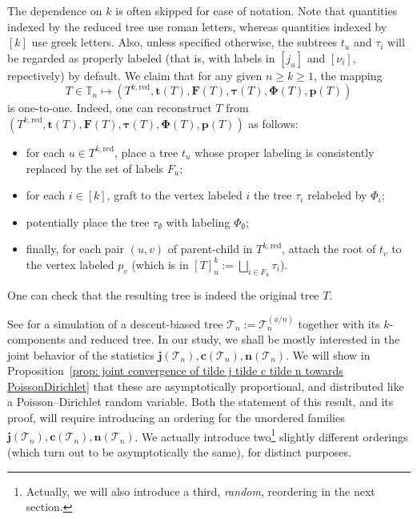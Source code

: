 \documentclass{article}
\theoremstyle{remark}
\newcommand{\bT}{\mathbb{T}}
\newcommand{\cT}{\mathcal{T}}
\newcommand{\bc}{\mathbf{c}}
\newcommand{\bj}{\mathbf{j}}
\newcommand{\bn}{\mathbf{n}}
\newcommand{\red}{\mathrm{red}}
\begin{document}
The dependence on $k$ is often skipped for ease of notation.
Note that quantities indexed by the reduced tree use roman letters, whereas quantities indexed by $[k]$ use greek letters.
Also, unless specified otherwise, the subtrees $t_u$ and $\tau_i$ will be regarded as {properly} labeled (that is, with labels in $[j_u]$ and $[\nu_i]$, repectively) by default.
We claim that for any given $n\ge k\ge1$, the mapping 
\[
    T \in \bT_n \mapsto \left( T^{k,\red}, \mathbf{t}(T), \mathbf{F}(T), \bm{\tau}(T), \mathbf{\Phi}(T), \mathbf{p}(T) \right)
\]
is one-to-one.
Indeed, one can reconstruct $T$ from $\left( T^{k,\red}, \mathbf{t}(T), \mathbf{F}(T), \bm{\tau}(T), \mathbf{\Phi}(T), \mathbf{p}(T) \right)$ as follows:
\begin{itemize}
\item for each $u\in T^{k,\red}$, place a tree $t_u$ whose proper labeling is consistently replaced by the set of labels $F_u$;
\item for each $i\in[k]$, graft to the vertex labeled $i$ the tree $\tau_i$ relabeled by $\Phi_i$;
\item potentially place the tree $\tau_\emptyset$ with labeling $\Phi_\emptyset$;
\item  finally, for each pair $(u,v)$ of parent-child in $T^{k,\red}$, attach the root of $t_v$ to the vertex labeled $p_v$ (which is in $[T]_u^k := \bigsqcup_{i\in F_u} \tau_i$).
\end{itemize}
One can check that the resulting tree is indeed the original tree $T$.

See  for a simulation of a descent-biased tree $\cT_n := \cT_n^{(a/n)}$ together with its $k$-components and reduced tree.
In our study, we shall be mostly interested in the joint behavior of the statistics $\bj(\cT_n), \bc(\cT_n), \bn(\cT_n)$.
We will show in Proposition~\ref{prop: joint convergence of tilde j tilde c tilde n towards PoissonDirichlet} that these are asymptotically proportional, and distributed like a Poisson--Dirichlet random variable.
Both the statement of this result, and its proof, will require introducing an ordering for the unordered families $\bj(\cT_n), \bc(\cT_n), \bn(\cT_n)$.
We actually introduce two\footnote{
    Actually, we will also introduce a third, \emph{random}, reordering in the next section.
} slightly different orderings (which turn out to be asymptotically the same), for distinct purposes.
\end{document}
